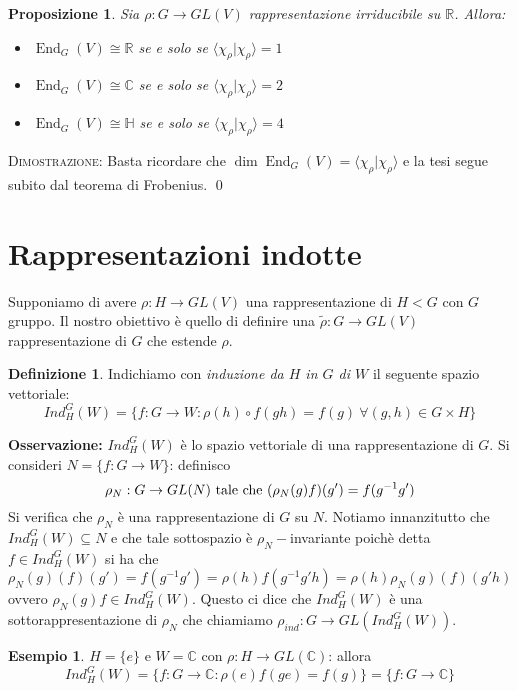 \documentclass[11pt]{article}
\theoremstyle{plain}
\newtheorem{prop}[thm]{Proposizione}
\theoremstyle{definition}
\newtheorem{defn}{Definizione}[section]
\newtheorem{exmp}{Esempio}[section]
\theoremstyle{remark}
\newcommand{\C}{\mathbb{C}}
\newcommand{\R}{\mathbb{R}}
\newcommand{\HH}{\mathbb{H}}
\DeclareMathOperator{\End}{End}
\begin{document}
\begin{prop}
Sia $\rho:G\to GL(V)$ rappresentazione irriducibile su $\R$. Allora:
\begin{itemize}
\item $\End_G(V) \cong \R$ se e solo se $\langle\chi_\rho|\chi_\rho\rangle = 1$
\item $\End_G(V) \cong \C$ se e solo se $\langle\chi_\rho|\chi_\rho\rangle = 2$
\item $\End_G(V) \cong \HH$ se e solo se $\langle\chi_\rho|\chi_\rho\rangle = 4$
\end{itemize}
\end{prop}
\textsc{Dimostrazione: }
Basta ricordare che $\dim \End_G(V) = \langle\chi_\rho|\chi_\rho\rangle$ e la tesi segue subito
dal teorema di Frobenius.
\qed










\newpage
\section{Rappresentazioni indotte}
Supponiamo di avere $\rho:H\rightarrow GL(V)$ una rappresentazione di $H<G$ con $G$ gruppo. Il nostro obiettivo è quello di definire una $\widetilde{\rho}:G\rightarrow GL(V)$ rappresentazione di $G$ che estende $\rho$.

\begin{defn}Indichiamo con \emph{induzione da $H$ in $G$ di $W$} il seguente spazio vettoriale:
\[Ind_H^G(W)=\{f:G\rightarrow W: \rho(h)\circ f(gh)=f(g)\ \forall (g,h)\in G\times H\}   \]
\end{defn}

\textbf{Osservazione:} $Ind_H^G(W)$ è lo spazio vettoriale di una rappresentazione di $G$.
Si consideri $N=\{f:G\rightarrow W\}$: definisco
\[\rho_N:G\rightarrow GL(N) \textup{ tale che }(\rho_N(g)f)(g')=f(g^{-1}g')\]
Si verifica che $\rho_N$ è una rappresentazione di $G$ su $N$. Notiamo innanzitutto che $Ind_H^G(W)\subseteq N$ e che tale sottospazio è $\rho_N-$invariante poichè detta $f\in Ind_H^G(W)$ si ha che
\[ \rho_N(g)(f)(g')=f(g^{-1}g')=\rho(h)f(g^{-1}g'h)=\rho(h)\rho_N(g)(f)(g'h)\]
ovvero $\rho_N(g)f\in Ind_H^G(W)$. Questo ci dice che $Ind_H^G(W)$ è una sottorappresentazione di $\rho_N$ che chiamiamo $\rho_{ind}:G\rightarrow GL(Ind_H^G(W))$.

\begin{exmp}
$H=\{e\}$ e $W=\C$ con $\rho:H\rightarrow GL(\C)$: allora
\[Ind_H^G(W)=\{f:G\rightarrow \C:\rho(e)f(ge)=f(g)\}=\{f:G\rightarrow \C\}\]
\end{exmp}
\end{document}
